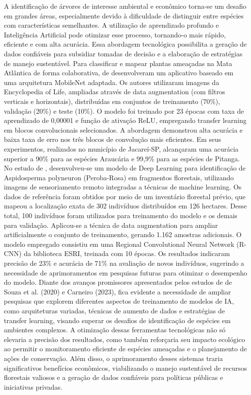 A identificação de árvores de interesse ambiental e econômico torna-se um desafio em grandes áreas, especialmente devido à dificuldade de distinguir entre espécies com características semelhantes. A utilização de aprendizado profundo e Inteligência Artificial pode otimizar esse processo, tornando-o mais rápido, eficiente e com alta acurácia. Essa abordagem tecnológica possibilita a geração de dados confiáveis para subsidiar tomadas de decisão e a elaboração de estratégias de manejo sustentável.
Para classificar e mapear plantas ameaçadas na Mata Atlântica de forma colaborativa, de \cite{de2020plantai} desenvolveram um aplicativo baseado em uma arquitetura MobileNet adaptada. Os autores utilizaram imagens da Encyclopedia of Life, ampliadas através de data augmentation (com filtros verticais e horizontais), distribuídas em conjuntos de treinamento (70\%), validação (20\%) e teste (10\%). O modelo foi treinado por 23 épocas com taxa de aprendizado de 0,00001 e função de ativação ReLU, empregando transfer learning em blocos convolucionais selecionados. A abordagem demonstrou alta acurácia e baixa taxa de erro nos três blocos de convolução mais eficientes. Em seus experimentos, realizados no município de Jacareí-SP, alcançaram uma acurácia superior a 90\% para as espécies Araucária e 99,9\% para as espécies de Pitanga.
No estudo de \cite{carneiro2023uso}, desenvolveu-se um modelo de Deep Learning para identificação de Aspidosperma polyneuron (Peroba-Rosa) em fragmentos florestais, utilizando imagens de sensoriamento remoto integradas a técnicas de machine learning. Os dados de referência foram obtidos por meio de um inventário florestal prévio, que mapeou a localização exata de 302 indivíduos distribuídos em 126 hectares. Desse total, 100 indivíduos foram utilizados para treinamento do modelo e os demais para validação. Aplicou-se a técnica de data augmentation para ampliar artificialmente o conjunto de treinamento, gerando 1.162 amostras adicionais. O modelo empregado consistiu em uma Regional Convolutional Neural Network (R-CNN) da biblioteca ESRI, treinada com 10 épocas. Os resultados indicaram precisão de 23\% e acurácia de 71\% na avaliação de novos indivíduos, sugerindo a necessidade de aprimoramentos em pesquisas futuras para otimizar o desempenho do modelo.
Diante dos avanços promissores apresentados pelos estudos de de Souza et al. (2020) e Carneiro (2023), fica evidente a necessidade de ampliar pesquisas que explorem diferentes aspectos de treinamento de modelos de IA, como arquiteturas variadas, técnicas de aumento de dados e estratégias de transfer learning, visando superar os desafios de identificação de espécies em ambientes complexos. A otimização dessas ferramentas tecnológicas não só elevaria a precisão dos resultados, como também reforçaria seu impacto ecológico ao permitir o monitoramento eficiente de espécies ameaçadas e o planejamento de ações de conservação. Além disso, o aprimoramento desses sistemas traria significativos benefícios econômicos, viabilizando o manejo sustentável de recursos florestais valiosos e a geração de dados confiáveis para políticas públicas e iniciativas privadas.
